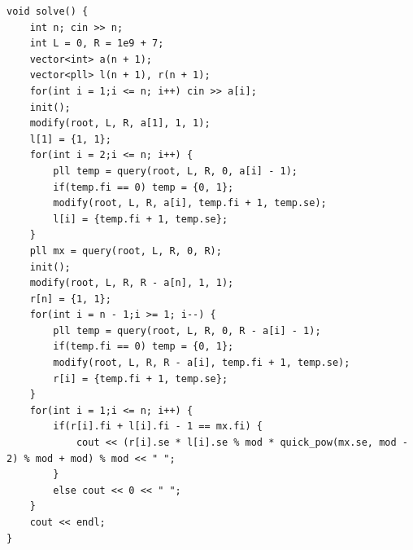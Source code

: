 \documentclass[twoside]{article}
\begin{document}
\begin{lstlisting}
void solve() {
    int n; cin >> n;
    int L = 0, R = 1e9 + 7;
    vector<int> a(n + 1);
    vector<pll> l(n + 1), r(n + 1);
    for(int i = 1;i <= n; i++) cin >> a[i];
    init();
    modify(root, L, R, a[1], 1, 1);
    l[1] = {1, 1};
    for(int i = 2;i <= n; i++) {
        pll temp = query(root, L, R, 0, a[i] - 1);
        if(temp.fi == 0) temp = {0, 1};
        modify(root, L, R, a[i], temp.fi + 1, temp.se);
        l[i] = {temp.fi + 1, temp.se};
    }
    pll mx = query(root, L, R, 0, R);
    init();
    modify(root, L, R, R - a[n], 1, 1);
    r[n] = {1, 1};
    for(int i = n - 1;i >= 1; i--) {
        pll temp = query(root, L, R, 0, R - a[i] - 1);
        if(temp.fi == 0) temp = {0, 1};
        modify(root, L, R, R - a[i], temp.fi + 1, temp.se);
        r[i] = {temp.fi + 1, temp.se};
    }
    for(int i = 1;i <= n; i++) {
        if(r[i].fi + l[i].fi - 1 == mx.fi) {
            cout << (r[i].se * l[i].se % mod * quick_pow(mx.se, mod - 2) % mod + mod) % mod << " ";
        }
        else cout << 0 << " ";
    }
    cout << endl;
}
\end{lstlisting}
\end{document}
